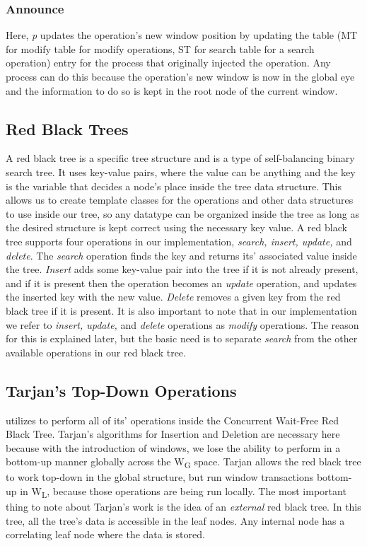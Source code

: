 \documentclass[letterpaper, 10 pt, conference]{ieeeconf}
\begin{document}
	 \subsubsection{Announce}
	 Here, \textit{p} updates the operation's new window position by updating the table (MT for modify table for modify operations, ST for search table for a search operation) entry for the process that originally injected the operation. Any process can do this because the operation's new window is now in the global eye and the information to do so is kept in the root node of the current window.
	 
	 \subsection{Red Black Trees}	
	 A red black tree is a specific tree structure and is a type of self-balancing binary search tree. It uses key-value pairs, where the value can be anything and the key is the variable that decides a node's place inside the tree data structure. This allows us to create template classes for the operations and other data structures to use inside our tree, so any datatype can be organized inside the tree as long as the desired structure is kept correct using the necessary key value. A red black tree supports four operations in our implementation, \textit{search, insert, update,} and \textit{delete}. The \textit{search} operation finds the key and returns its' associated value inside the tree. \textit{Insert} adds some key-value pair into the tree if it is not already present, and if it is present then the operation becomes an \textit{update} operation, and updates the inserted key with the new value. \textit{Delete} removes a given key from the red black tree if it is present. It is also important to note that in our implementation we refer to \textit{insert, update,} and \textit{delete} operations as \textit{modify} operations. The reason for this is explained later, but the basic need is to separate \textit{search} from the other available operations in our red black tree.
	 
	 \subsection*{Tarjan's Top-Down Operations}
	 \cite{c1} utilizes \cite{c7} to perform all of its' operations inside the Concurrent Wait-Free Red Black Tree. Tarjan's algorithms for Insertion and Deletion are necessary here because with the introduction of windows, we lose the ability to perform in a bottom-up manner globally across the W\textsubscript{G} space. Tarjan allows the red black tree to work top-down in the global structure, but run window transactions bottom-up in W\textsubscript{L}, because those operations are being run locally. The most important thing to note about Tarjan's work is the idea of an \textit{external} red black tree. In this tree, all the tree's data is accessible in the leaf nodes. Any internal node has a correlating leaf node where the data is stored.
\end{document}
